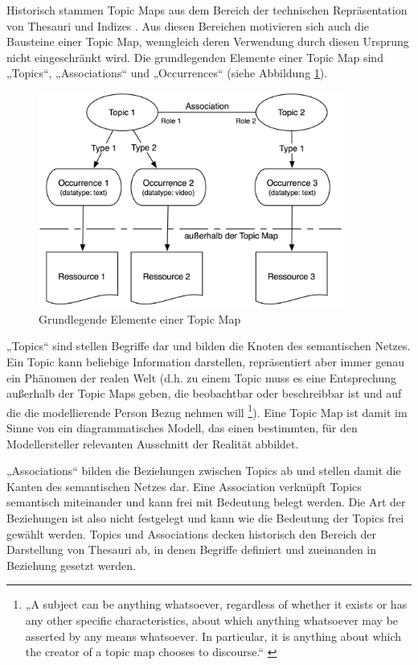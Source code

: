 Historisch stammen Topic Maps aus dem Bereich der technischen Repräsentation von Thesauri und Indizes \citep{Pepper00} \citep{Rath03}. Aus diesen Bereichen motivieren sich auch die Bausteine einer Topic Map, wenngleich deren Verwendung durch diesen Ursprung nicht eingeschränkt wird. Die grundlegenden Elemente einer Topic Map sind „Topics“, „Associations“ und „Occurrences“ (siehe Abbildung \ref{fig:img_Persistenz_TMBasic}). 

\begin{figure}[htbp]
	\centering
		\includegraphics[width=10cm]{img/Persistenz/TMBasic.png}
	\caption{Grundlegende Elemente einer Topic Map}
	\label{fig:img_Persistenz_TMBasic}
\end{figure}

„Topics“ sind stellen Begriffe dar und bilden die Knoten des semantischen Netzes. Ein Topic kann beliebige Information darstellen, repräsentiert aber immer genau ein Phänomen der realen Welt (d.h. zu einem Topic muss es eine Entsprechung außerhalb der Topic Maps geben, die beobachtbar oder beschreibbar ist und auf die die modellierende Person Bezug nehmen will \footnote{„A subject can be anything whatsoever, regardless of whether it exists or has any other specific characteristics, about which anything whatsoever may be asserted by any means whatsoever. In particular, it is anything about which the creator of a topic map chooses to discourse.“ \citep[][S.8]{TMDM08}}). Eine Topic Map ist damit im Sinne von \citet{Stachowiak73} ein diagrammatisches Modell, das einen bestimmten, für den Modellersteller relevanten Ausschnitt der Realität abbildet.

„Associations“ bilden die Beziehungen zwischen Topics ab und stellen damit die Kanten des semantischen Netzes dar. Eine Association verknüpft Topics semantisch miteinander und kann frei mit Bedeutung belegt werden. Die Art der Beziehungen ist also nicht festgelegt und kann wie die Bedeutung der Topics frei gewählt werden. Topics und Associations decken historisch den Bereich der Darstellung von Thesauri ab, in denen Begriffe definiert und zueinanden in Beziehung gesetzt werden. 


